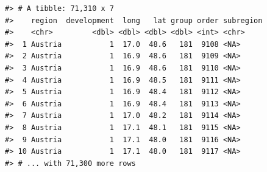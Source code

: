 \documentclass[
  11pt,
  a4paper,
  twoside]{scrbook}
\newenvironment{Shaded}{\begin{snugshade}}{\end{snugshade}}
\newcommand{\AttributeTok}[1]{\textcolor[rgb]{0.77,0.63,0.00}{#1}}
\newcommand{\DecValTok}[1]{\textcolor[rgb]{0.00,0.00,0.81}{#1}}
\newcommand{\FloatTok}[1]{\textcolor[rgb]{0.00,0.00,0.81}{#1}}
\newcommand{\FunctionTok}[1]{\textcolor[rgb]{0.00,0.00,0.00}{#1}}
\newcommand{\NormalTok}[1]{#1}
\newcommand{\OtherTok}[1]{\textcolor[rgb]{0.56,0.35,0.01}{#1}}
\newcommand{\SpecialCharTok}[1]{\textcolor[rgb]{0.00,0.00,0.00}{#1}}
\newcommand{\StringTok}[1]{\textcolor[rgb]{0.31,0.60,0.02}{#1}}
\begin{document}
\begin{Shaded}
\end{Shaded}

\linespread{1}

\begin{verbatim}
#> # A tibble: 71,310 x 7
#>    region  development  long   lat group order subregion
#>    <chr>         <dbl> <dbl> <dbl> <dbl> <int> <chr>    
#>  1 Austria           1  17.0  48.6   181  9108 <NA>     
#>  2 Austria           1  16.9  48.6   181  9109 <NA>     
#>  3 Austria           1  16.9  48.6   181  9110 <NA>     
#>  4 Austria           1  16.9  48.5   181  9111 <NA>     
#>  5 Austria           1  16.9  48.4   181  9112 <NA>     
#>  6 Austria           1  16.9  48.4   181  9113 <NA>     
#>  7 Austria           1  17.0  48.2   181  9114 <NA>     
#>  8 Austria           1  17.1  48.1   181  9115 <NA>     
#>  9 Austria           1  17.1  48.0   181  9116 <NA>     
#> 10 Austria           1  17.1  48.0   181  9117 <NA>     
#> # ... with 71,300 more rows
\end{verbatim}
\end{document}
